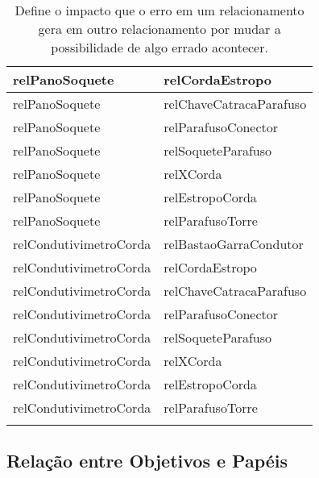 \begin{center}
\begin{longtable}[H]{|l|l|}
relPanoSoquete                                  & relCordaEstropo                                  \\ \hline
relPanoSoquete                                  & relChaveCatracaParafuso                          \\ \hline
relPanoSoquete                                  & relParafusoConector                              \\ \hline
relPanoSoquete                                  & relSoqueteParafuso                               \\ \hline
relPanoSoquete                                  & relXCorda                                        \\ \hline
relPanoSoquete                                  & relEstropoCorda                                  \\ \hline
relPanoSoquete                                  & relParafusoTorre                                 \\ \hline
relCondutivimetroCorda                          & relBastaoGarraCondutor                           \\ \hline
relCondutivimetroCorda                          & relCordaEstropo                                  \\ \hline
relCondutivimetroCorda                          & relChaveCatracaParafuso                          \\ \hline
relCondutivimetroCorda                          & relParafusoConector                              \\ \hline
relCondutivimetroCorda                          & relSoqueteParafuso                               \\ \hline
relCondutivimetroCorda                          & relXCorda                                        \\ \hline
relCondutivimetroCorda                          & relEstropoCorda                                  \\ \hline
relCondutivimetroCorda                          & relParafusoTorre                                 \\ \hline
\caption{Define o impacto que o erro em um relacionamento gera em outro relacionamento por mudar a possibilidade de algo errado acontecer.}
\label{relation1}
\end{longtable}
\end{center}

\subsection{Relação entre Objetivos e Papéis}


